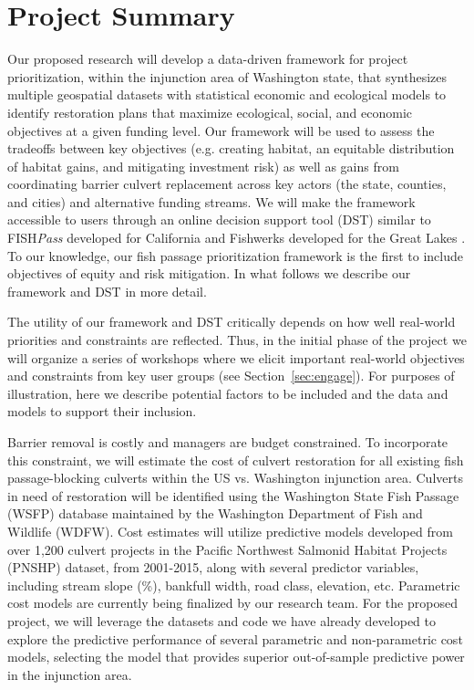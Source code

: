 \documentclass[12pt]{elsarticle}
\begin{document}
\section{Project Summary}\label{sec:summary} %

Our proposed research will develop a data-driven framework for project prioritization, within the injunction area of Washington state, that synthesizes multiple geospatial datasets with statistical economic and ecological models to identify restoration plans that maximize ecological, social, and economic objectives at a given funding level. Our framework will be used to assess the tradeoffs between key objectives (e.g. creating habitat, an equitable distribution of habitat gains, and mitigating investment risk) as well as gains from coordinating barrier culvert replacement across key actors (the state, counties, and cities) and alternative funding streams. We will make the framework accessible to users through an online decision support tool (DST) similar to FISH\emph{Pass} developed for California \citep{optipass2015migratory} and Fishwerks developed for the Great Lakes \citep{moody2017pet}. To our knowledge, our fish passage prioritization framework is the first to include objectives of equity and risk mitigation. In what follows we describe our framework and DST in more detail.

The utility of our framework and DST critically depends on how well real-world priorities and constraints are reflected. Thus, in the initial phase of the project we will organize a series of workshops where we elicit important real-world objectives and constraints from key user groups (see Section~\ref{sec:engage}). For purposes of illustration, here we describe potential factors to be included and the data and models to support their inclusion.   

Barrier removal is costly and managers are budget constrained. To incorporate this constraint, we will estimate the cost of culvert restoration for all existing fish passage-blocking culverts within the US vs. Washington injunction area. Culverts in need of restoration will be identified using the Washington State Fish Passage (WSFP) database maintained by the Washington Department of Fish and Wildlife (WDFW). Cost estimates will utilize predictive models developed from over 1,200 culvert projects in the Pacific Northwest Salmonid Habitat Projects (PNSHP) dataset, from 2001-2015, along with several predictor variables, including stream slope (\%), bankfull width, road class, elevation, etc. Parametric cost models are currently being finalized by our research team. For the proposed project, we will leverage the datasets and code we have already developed to explore the predictive performance of several parametric and non-parametric cost models, selecting the model that provides superior out-of-sample predictive power in the injunction area.
\end{document}
